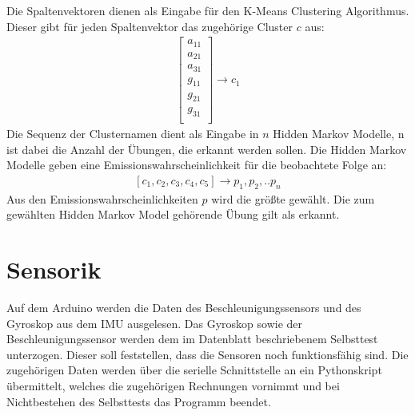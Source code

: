\documentclass{article}
\begin{document}
Die Spaltenvektoren dienen als Eingabe für den K-Means Clustering Algorithmus.
Dieser gibt für jeden Spaltenvektor das zugehörige Cluster $c$ aus:
\begin{align*}
\left[\begin{array}{r}
a_{11}\\
a_{21}\\
a_{31}\\
g_{11}\\
g_{21}\\
g_{31}\\
\end{array}\right]
\rightarrow c_1
\end{align*}
Die Sequenz der Clusternamen dient als Eingabe in $n$ Hidden Markov Modelle, n ist dabei die Anzahl der Übungen, die erkannt werden sollen.
Die Hidden Markov Modelle geben eine Emissionswahrscheinlichkeit für die beobachtete Folge an:
\begin{align*}
\left[c_1, c_2, c_3, c_4, c_5\right] \rightarrow p_1, p_2, .. p_n
\end{align*}
Aus den Emissionswahrscheinlichkeiten $p$ wird die größte gewählt.
Die zum gewählten Hidden Markov Model gehörende Übung gilt als erkannt.

\section{Sensorik}
Auf dem Arduino werden die Daten des Beschleunigungssensors und des Gyroskop aus dem IMU ausgelesen.
Das Gyroskop sowie der Beschleunigungssensor werden dem im Datenblatt beschriebenem Selbsttest unterzogen.
Dieser soll feststellen, dass die Sensoren noch funktionsfähig sind.
Die zugehörigen Daten werden über die serielle Schnittstelle an ein Pythonskript übermittelt, welches die zugehörigen Rechnungen vornimmt und bei Nichtbestehen des Selbsttests das Programm beendet.
\end{document}
